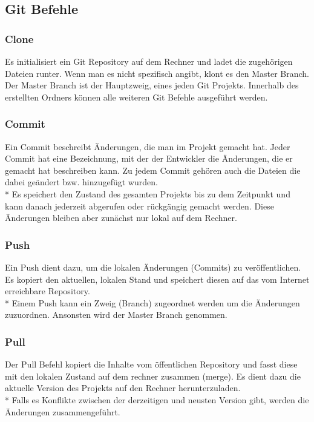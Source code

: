 \subsection{Git Befehle}

\subsubsection{Clone}
\label{sec:Clone}
Es initialisiert ein Git Repository auf dem Rechner und ladet die zugehörigen Dateien runter.
Wenn man es nicht spezifisch angibt, klont es den Master Branch. Der Master Branch ist der Hauptzweig, eines jeden Git Projekts.
Innerhalb des erstellten Ordners können alle weiteren Git Befehle ausgeführt werden. \cite{GitCmnds}
\subsubsection{Commit}
\label{sec:Commit}
Ein Commit beschreibt Änderungen, die man im Projekt gemacht hat. Jeder Commit hat eine Bezeichnung, mit der der Entwickler die Änderungen,
die er gemacht hat beschreiben kann. Zu jedem Commit gehören auch die Dateien die dabei geändert bzw. hinzugefügt wurden.
\\* Es speichert den Zustand des gesamten Projekts bis zu dem Zeitpunkt und kann danach jederzeit abgerufen oder rückgängig gemacht werden.
Diese Änderungen bleiben aber zunächst nur lokal auf dem Rechner. \cite{GitCmnds}

\subsubsection{Push}
\label{sec:Push}

Ein Push dient dazu, um die lokalen Änderungen (Commits) zu veröffentlichen. Es kopiert den aktuellen, lokalen Stand und speichert diesen auf 
das vom Internet erreichbare Repository. \\* Einem Push kann ein Zweig (Branch) zugeordnet werden um die Änderungen zuzuordnen. 
Ansonsten wird der Master Branch genommen. \cite{GitCmnds}

\subsubsection{Pull}
\label{sec:Pull}
Der Pull Befehl kopiert die Inhalte vom öffentlichen Repository und fasst diese mit den lokalen Zustand auf dem 
rechner zusammen (merge). Es dient dazu die aktuelle Version des Projekts auf den Rechner herunterzuladen.
\\* Falls es Konflikte zwischen der derzeitigen und neusten Version gibt, werden die Änderungen zusammengeführt. \cite{GitCmnds}

